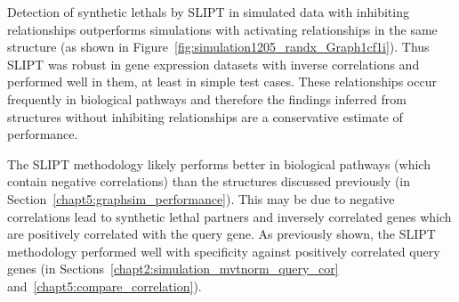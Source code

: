 Detection of \glspl{synthetic lethal} by \gls{SLIPT} in simulated data with inhibiting relationships outperforms simulations with activating relationships in the same  structure (as shown in Figure~\ref{fig:simulation1205_randx_Graph1cf1i}). Thus \gls{SLIPT} was robust in \gls{gene expression} datasets with inverse correlations and performed well in them, at least in simple test cases. These relationships occur frequently in biological pathways and therefore the findings inferred from  structures without inhibiting relationships are a conservative estimate of performance.

The \gls{SLIPT} methodology likely performs better in biological pathways (which contain negative correlations) than the  structures discussed previously (in Section~\ref{chapt5:graphsim_performance}). This may be due to negative correlations lead to \gls{synthetic lethal} partners and inversely correlated genes which are positively correlated with the query gene. As previously shown, the \gls{SLIPT} methodology performed well with specificity against positively correlated query genes (in Sections~\ref{chapt2:simulation_mvtnorm_query_cor} and~\ref{chapt5:compare_correlation}).%

